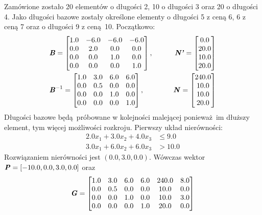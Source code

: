Zamówione zostało 20 elementów o długości 2, 10 o długości 3 oraz 20 o długości 4. Jako długości bazowe zostały określone elementy o długości 5 z ceną 6, 6 z ceną 7 oraz o długości 9 z ceną 10. \newline
Początkowo:
\begin{equation*}
  \begin{aligned}
    &\textbf{\textit{B}} =
    \begin{bmatrix}
      1.0 & -6.0 & -6.0 & -6.0 \\
      0.0 & 2.0 & 0.0 & 0.0 \\
      0.0 & 0.0 & 1.0 & 0.0 \\
      0.0 & 0.0 & 0.0 & 1.0
    \end{bmatrix}, \qquad
    &\textbf{\textit{N'}} =
    \begin{bmatrix}
      0.0\\
      20.0\\
      10.0\\
      20.0
    \end{bmatrix} \\
    &\textbf{\textit{B}}^{-1} =
    \begin{bmatrix}
      1.0 & 3.0 & 6.0 & 6.0 \\
      0.0 & 0.5 & 0.0 & 0.0 \\
      0.0 & 0.0 & 1.0 & 0.0 \\
      0.0 & 0.0 & 0.0 & 1.0
    \end{bmatrix}, \quad
    &\textbf{\textit{N}} =
    \begin{bmatrix}
      240.0\\
      10.0\\
      10.0\\
      20.0
    \end{bmatrix}
  \end{aligned}
\end{equation*}
Długości bazowe będą próbowane w kolejności malejącej ponieważ im dłuższy element, tym więcej możliwości rozkroju. Pierwszy układ nierówności:
\begin{equation*}
  \begin{aligned}
    2.0 x_{1}+ 3.0 x_{2}+ 4.0 x_{3} &\le 9.0 \\
    3.0 x_{1}+ 6.0 x_{2}+ 6.0 x_{3} &> 10.0
  \end{aligned}
\end{equation*}
Rozwiązaniem nierówności jest $(0.0,3.0,0.0)$. Wówczas wektor $\textbf{\textit{P}} = [-10.0, 0.0, 3.0, 0.0]$ oraz
\begin{equation*}
  \begin{aligned}
    \textbf{\textit{G}} =
    \begin{bmatrix}
      1.0 & 3.0 & 6.0 & 6.0 & 240.0 & 8.0  \\
      0.0 & 0.5 & 0.0 & 0.0 & 10.0 & 0.0 \\
      0.0 & 0.0 & 1.0 & 0.0 & 10.0 & 3.0 \\
      0.0 & 0.0 & 0.0 & 1.0 & 20.0 & 0.0
    \end{bmatrix}
  \end{aligned}
\end{equation*}
